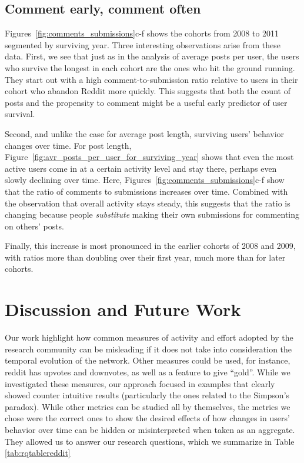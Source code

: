 \subsection{Comment early, comment often}

Figures~\ref{fig:comments_submissions}c-f shows the cohorts from 2008 to 2011 segmented by surviving year.  Three interesting observations arise from these data.  First, we see that just as in the analysis of average posts per user, the users who survive the longest in each cohort are the ones who hit the ground running.  They start out with a high comment-to-submission ratio relative to users in their cohort who abandon Reddit more quickly.  This suggests that both the count of posts and the propensity to comment might be a useful early predictor of user survival.

Second, and unlike the case for average post length, surviving users' behavior changes over time.  For post length, Figure~\ref{fig:avr_posts_per_user_for_surviving_year} shows that even the most active users come in at a certain activity level and stay there, perhaps even slowly declining over time.  Here, Figures~\ref{fig:comments_submissions}c-f show that the ratio of comments to submissions increases over time.  Combined with the observation that overall activity stays steady, this suggests that the ratio is changing because people \textit{substitute} making their own submissions for commenting on others' posts.

Finally, this increase is most pronounced in the earlier cohorts of 2008 and 2009, with ratios more than doubling over their first year, much more than for later cohorts.

\section{Discussion and Future Work}

Our work highlight how common measures of activity and effort adopted by the research community can be misleading if it does not take into consideration the temporal evolution of the network. Other measures could be used, for instance, reddit has upvotes and downvotes, as well as a feature to give ``gold''. While we investigated these measures, our approach focused in examples that clearly showed counter intuitive results (particularly the ones related to the Simpson's paradox). While other metrics can be studied all by themselves, the metrics we chose were the correct ones to show the desired effects of how changes in users' behavior over time can be hidden or misinterpreted when taken as an aggregate. They allowed us to answer our research questions, which we summarize in Table \ref{tab:rqtablereddit}

